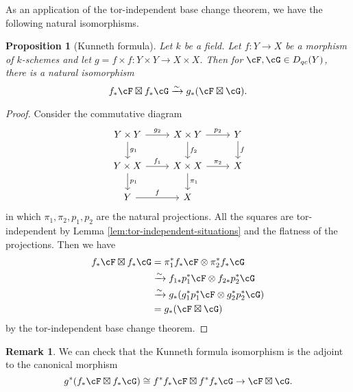 \documentclass[12pt]{amsart}
\numberwithin{equation}{section}
\theoremstyle{plain}
\newtheorem{proposition}[theorem]{Proposition}
\theoremstyle{definition}
\newtheorem{remark}[theorem]{Remark}
\DeclareMathOperator{\id}{\mathrm{id}}
\begin{document}
As an application of the tor-independent base change theorem, we have the following natural isomorphisms.
\begin{proposition}[Kunneth formula]
    Let $k$ be a field.
    Let $f \colon Y \to X$ be a morphism of $k$-schemes and let $g = f\times f \colon Y \times Y \to X \times X$.
    Then for $\cF, \cG \in D_{qc}(Y)$, there is a natural isomorphism
    \begin{equation}
        f_*\cF \boxtimes f_*\cG \xrightarrow{\sim} g_*(\cF \boxtimes \cG).
    \end{equation}
\end{proposition}
\begin{proof}
    Consider the commutative diagram
    \[
        \begin{tikzcd}
            Y\times Y \arrow[r,"g_2"]\arrow[d, "g_1"] & X\times Y \arrow[d,"f_2"] \arrow[r, "p_2"] &Y\arrow[d, "f"]\\
            Y \times X \arrow[r, "f_1"]\arrow[d, "p_1"]& X \times X \arrow[r, "\pi_2"]\arrow[d, "\pi_1"]&X\\
            Y \arrow[r, "f"]&X&
        \end{tikzcd}
    \]
    in which $\pi_1, \pi_2, p_1, p_2$ are the natural projections.
    All the squares are tor-independent by Lemma \ref{lem:tor-independent-situations} and the flatness of the projections.
    Then we have
    \begin{align*}
        f_*\cF \boxtimes f_*\cG & = \pi_1^*f_*\cF \otimes \pi_2^*f_*\cG                      \\
                                & \xrightarrow{\sim} f_{1*}p_1^*\cF \otimes f_{2*}p_2^*\cG   \\
                                & \xrightarrow{\sim}g_*(g_1^*p_1^*\cF \otimes g_2^*p_2^*\cG) \\
                                & = g_*(\cF \boxtimes \cG)
    \end{align*}
    by the tor-independent base change theorem.
\end{proof}
\begin{remark}
    We can check that the Kunneth formula isomorphism is the adjoint to the canonical morphism
    \begin{equation}
        g^*(f_*\cF \boxtimes f_*\cG) \cong f^*f_*\cF \boxtimes f^*f_*\cG \to \cF \boxtimes \cG.
    \end{equation}
\end{remark}
\end{document}
